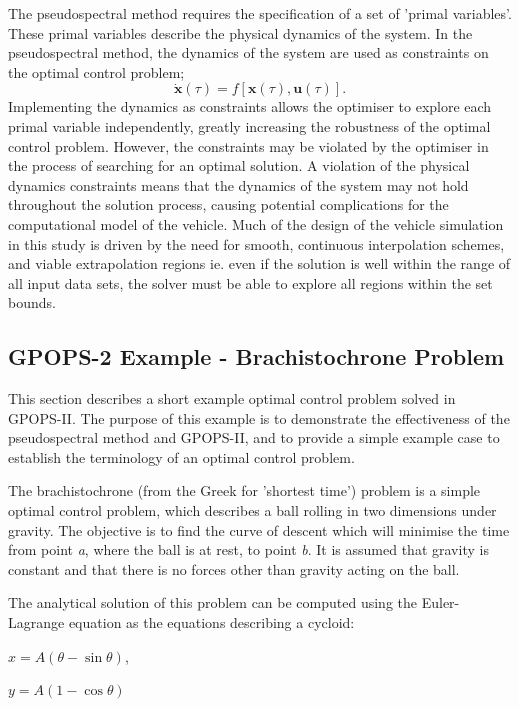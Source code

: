 The pseudospectral method requires the specification of a set of 'primal variables'. These primal variables describe the physical dynamics of the system. In the pseudospectral method, the dynamics of the system are used as constraints on the optimal control problem;
\begin{equation} \label{eq:state2}
\dot{\textbf{x}}(\tau) = f[\textbf{x}(\tau),\textbf{u}(\tau)].
\end{equation}
Implementing the dynamics as constraints allows the optimiser to explore each primal variable independently, greatly increasing the robustness of the optimal control problem. However, the constraints may be violated by the optimiser in the process of searching for an optimal solution. A violation of the physical dynamics constraints means that the dynamics of the system may not hold throughout the solution process, causing potential complications for the computational model of the vehicle. Much of the design of the vehicle simulation in this study is driven by the need for smooth, continuous interpolation schemes, and viable extrapolation regions ie. even if the solution is well within the range of all input data sets, the solver must be able to explore all regions within the set bounds. 

\subsection{GPOPS-2 Example - Brachistochrone Problem}
This section describes a short example optimal control problem solved in GPOPS-II. The purpose of this example is to demonstrate the effectiveness of the pseudospectral method and GPOPS-II, and to provide a simple example case to establish the terminology of an optimal control problem.  


The brachistochrone (from the Greek for 'shortest time') problem is a simple optimal control problem, which describes a ball rolling in two dimensions under gravity. The objective is to find the curve of descent which will minimise the time from point \textit{a}, where the ball is at rest, to point \textit{b}. It is assumed that gravity is constant and that there is no forces other than gravity acting on the ball. 

The analytical solution of this problem can be computed using the Euler-Lagrange equation as the equations describing a cycloid:

$x = A(\theta - \sin\theta) $,

$y=A(1 - \cos\theta)$


